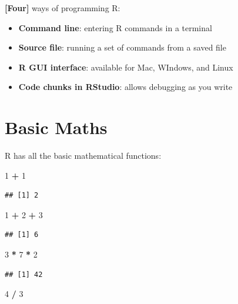 \documentclass[]{book}
\newenvironment{Shaded}{\begin{snugshade}}{\end{snugshade}}
\newcommand{\DecValTok}[1]{\textcolor[rgb]{0.00,0.00,0.81}{#1}}
\newcommand{\OperatorTok}[1]{\textcolor[rgb]{0.81,0.36,0.00}{\textbf{#1}}}
\newcommand{\StringTok}[1]{\textcolor[rgb]{0.31,0.60,0.02}{#1}}
\providecommand{\tightlist}{%
  \setlength{\itemsep}{0pt}\setlength{\parskip}{0pt}}
\theoremstyle{definition}
\theoremstyle{definition}
\theoremstyle{definition}
\theoremstyle{remark}
\begin{document}
\textbf{{[}Four{]}} ways of programming R:

\begin{itemize}
\tightlist
\item
  \textbf{Command line}: entering R commands in a terminal
\item
  \textbf{Source file}: running a set of commands from a saved file
\item
  \textbf{R GUI interface}: available for Mac, WIndows, and Linux
\item
  \textbf{Code chunks in RStudio}: allows debugging as you write
\end{itemize}

\hypertarget{basic-maths}{%
\section{Basic Maths}\label{basic-maths}}

R has all the basic mathematical functions:

\begin{Shaded}
\begin{Highlighting}[]
\DecValTok{1} \OperatorTok{+}\StringTok{ }\DecValTok{1}
\end{Highlighting}
\end{Shaded}

\begin{verbatim}
## [1] 2
\end{verbatim}

\begin{Shaded}
\begin{Highlighting}[]
\DecValTok{1} \OperatorTok{+}\StringTok{ }\DecValTok{2} \OperatorTok{+}\StringTok{ }\DecValTok{3}
\end{Highlighting}
\end{Shaded}

\begin{verbatim}
## [1] 6
\end{verbatim}

\begin{Shaded}
\begin{Highlighting}[]
\DecValTok{3} \OperatorTok{*}\StringTok{ }\DecValTok{7} \OperatorTok{*}\StringTok{ }\DecValTok{2}
\end{Highlighting}
\end{Shaded}

\begin{verbatim}
## [1] 42
\end{verbatim}

\begin{Shaded}
\begin{Highlighting}[]
\DecValTok{4} \OperatorTok{/}\StringTok{ }\DecValTok{3}
\end{Highlighting}
\end{Shaded}
\end{document}
